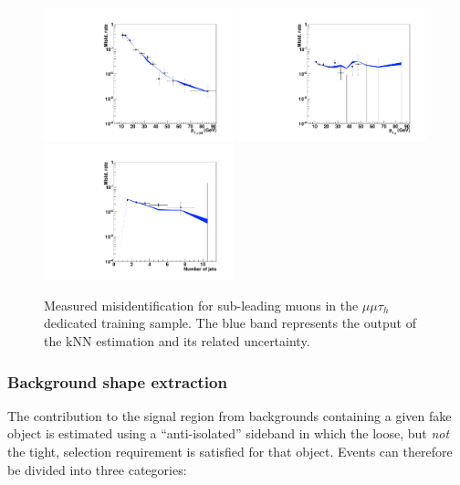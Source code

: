\begin{figure}
\centering
\includegraphics[width=0.49\textwidth]{4_Analisys/pics/8TeV/plots/fakerates/m_mmt_subleading_kNN_muonJetPt.pdf}
\includegraphics[width=0.49\textwidth]{4_Analisys/pics/8TeV/plots/fakerates/m_mmt_subleading_kNN_muonPt.pdf}\\
\includegraphics[width=0.49\textwidth]{4_Analisys/pics/8TeV/plots/fakerates/m_mmt_subleading_kNN_numJets20.pdf}
\caption{Measured misidentification for sub-leading muons in the $\mu\mu\tau_h$ dedicated training sample. The blue band represents the output of the kNN estimation and its related uncertainty.}
\label{fig:fake_rate_sample}
\end{figure}


\subsubsection{Background shape extraction}
The contribution to the signal region from backgrounds containing a given fake object is estimated using a ``anti-isolated'' sideband in which the loose, but \emph{not} the tight, 
selection requirement is satisfied for that object. Events can therefore be divided into three categories:

